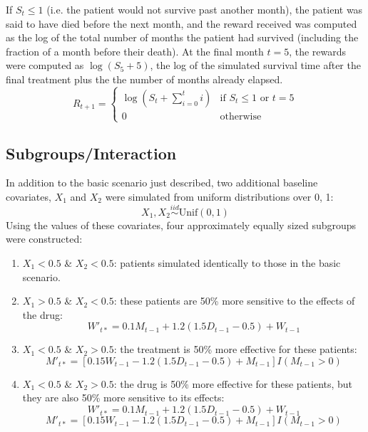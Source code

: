 \documentclass[12pt]{article}
\begin{document}
If $S_{t} \leq 1$ (i.e. the patient would not survive past another month), the patient was said to have died before the next month, and the reward received was computed as the log of the total number of months the patient had survived (including the fraction of a month before their death). At the final month $t = 5$, the rewards were computed as $\log(S_{5} + 5)$, the log of the simulated survival time after the final treatment plus the the number of months already elapsed. 
\begin{equation}
  R_{t + 1} = \begin{cases}
    \log(S_{t} + \sum_{i = 0}^{t} i) & \text{if } S_{t} \leq 1 \text{ or } t = 5 \\
    0 & \text{otherwise}
  \end{cases}
\end{equation}



\subsection{Subgroups/Interaction} %
\label{sub:subgroups_interaction}

In addition to the basic scenario just described, two additional baseline covariates, $X_{1}$ and $X_{2}$ were simulated from uniform distributions over 0, 1:
\begin{equation}
  X_{1}, X_{2} \overset{iid}{\sim} \text{Unif}(0, 1) 
\end{equation}
Using the values of these covariates, four approximately equally sized subgroups were constructed:
\begin{enumerate}
  \item $X_{1} < 0.5$ \& $X_{2} < 0.5$: patients simulated identically to those in the basic scenario.
  \item $X_{1} > 0.5$ \& $X_{2} < 0.5$: these patients are 50\% more sensitive to the effects of the drug:
   \begin{equation}
   W'_{t*} = 0.1 M_{t-1} + 1.2 (1.5 D_{t-1} - 0.5) + W_{t - 1}
   \end{equation}
   \item $X_{1} < 0.5$ \& $X_{2} > 0.5$: the treatment is 50\% more effective for these patients:
\begin{equation}
M'_{t*} = [0.15 W_{t-1} - 1.2 (1.5 D_{t-1} - 0.5) + M_{t - 1}] I(M_{t-1} > 0)
\end{equation}
   \item $X_{1} < 0.5$ \& $X_{2} > 0.5$: the drug is 50\% more effective for these patients, but they are also 50\% more sensitive to its effects:
   \begin{equation}
   W'_{t*} = 0.1 M_{t-1} + 1.2 (1.5 D_{t-1} - 0.5) + W_{t - 1}
   \end{equation}
   \begin{equation}
   M'_{t*} = [0.15 W_{t-1} - 1.2 (1.5 D_{t-1} - 0.5) + M_{t - 1}] I(M_{t-1} > 0)
   \end{equation}
\end{enumerate}
\end{document}
